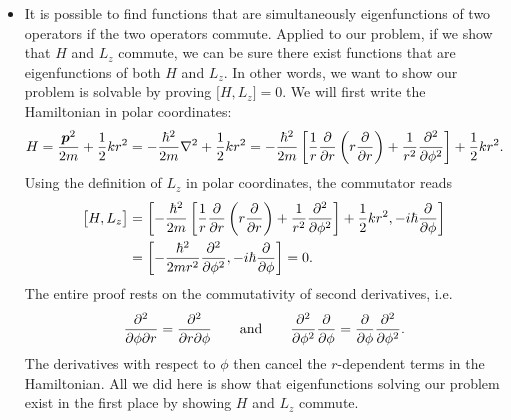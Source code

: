 \documentclass[11pt, a4paper]{article}
\newcommand{\eqtext}[1]{\qquad \text{#1} \qquad}
\renewcommand{\vec}[1]{\bm{#1}} %
\begin{document}
\begin{itemize}
	\item It is possible to find functions that are simultaneously eigenfunctions of two operators if the two operators commute. Applied to our problem, if we show that $ H $ and $ L_{z} $ commute, we can be sure there exist functions that are eigenfunctions of both $ H $ and $ L_{z} $. In other words, we want to show our problem is solvable by proving $ \big[H, L_{z}\big] = 0 $. We will first write the Hamiltonian in polar coordinates:
	\begin{equation*}
		H = \frac{\vec{p}^{2}}{2m} + \frac{1}{2}kr^{2} = -\frac{\hbar^{2}}{2m} \laplacian + \frac{1}{2}kr^{2} = -\frac{\hbar^{2}}{2m}\left [\frac{1}{r}\pdv{r}\left(r\pdv{r}\right) + \frac{1}{r^{2}}\pdv[2]{}{\phi}\right ] + \frac{1}{2}kr^{2}.
	\end{equation*}
	Using the definition of $ L_{z} $ in polar coordinates, the commutator reads
	\begin{align*}
		\big[H, L_{z}\big] &= \left[ -\frac{\hbar^{2}}{2m}\left [\frac{1}{r}\pdv{r}\left(r\pdv{r}\right) + \frac{1}{r^{2}}\pdv[2]{}{\phi}\right ] + \frac{1}{2}kr^{2}, -i\hbar \pdv{\phi}\right]\\
		&=\left[-\frac{\hbar^{2}}{2mr^{2}}\pdv[2]{}{\phi}, -i\hbar \pdv{\phi}\right] = 0.
	\end{align*}
	The entire proof rests on the commutativity of second derivatives, i.e. 
	\begin{equation*}
		\pdv{}{\phi}{r} = \pdv{}{r}{\phi} \eqtext{and} \pdv[2]{}{\phi} \pdv{\phi} =  \pdv{\phi} \pdv[2]{}{\phi}.
	\end{equation*} 
	The derivatives with respect to $ \phi $ then cancel the $ r $-dependent terms in the Hamiltonian. All we did here is show that eigenfunctions solving our problem exist in the first place by showing $ H $ and $ L_{z} $ commute.
	

\end{itemize}
\end{document}
